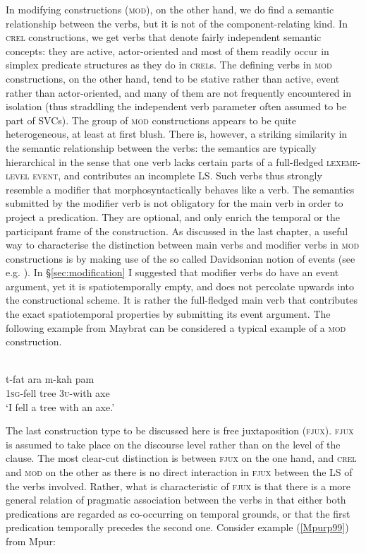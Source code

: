 In modifying constructions (\textsc{mod}), on the other hand, we do find a semantic relationship between the verbs, but it is not of the component-relating kind. In \textsc{crel} constructions, we get verbs that denote fairly independent semantic concepts: they are active, actor-oriented and most of them readily occur in simplex predicate structures as they do in \textsc{crel}s. The defining verbs in \textsc{mod} constructions, on the other hand, tend to be stative rather than active, event rather than actor-oriented, and many of them are not frequently encountered in isolation (thus straddling the independent verb parameter often assumed to be part of SVCs). The group of \textsc{mod} constructions appears to be quite heterogeneous, at least at first blush. There is, however, a striking similarity in the semantic relationship between the verbs: the semantics are typically hierarchical in the sense that one verb lacks certain parts of a full-fledged \textsc{lexeme-level event}, and contributes an incomplete LS. Such verbs thus strongly resemble a modifier that morphosyntactically behaves like a verb. The semantics submitted by the modifier verb is not obligatory for the main verb in order to project a predication. They are optional, and only enrich the temporal or the participant frame of the construction. As discussed in the last chapter, a useful way to characterise the distinction between main verbs and modifier verbs in \textsc{mod} constructions is by making use of the so called Davidsonian notion of events (see e.g. \citealt{maienborn2011event}). In §\ref{sec:modification} I suggested that modifier verbs do have an event argument, yet it is spatiotemporally empty, and does not percolate upwards into the constructional scheme. It is rather the full-fledged main verb that contributes the exact spatiotemporal properties by submitting its event argument. The following example from Maybrat can be considered a typical example of a \textsc{mod} construction. 

\ea 
{}\\
\gll t-fat ara m-kah pam \\
1\textsc{sg}-fell tree 3\textsc{u}-with axe \\
\glft `I fell a tree with an axe.'\\ 
\z

The last construction type to be discussed here is free juxtaposition (\textsc{fjux}). \textsc{fjux} is assumed to take place on the discourse level rather than on the level of the clause. The most clear-cut distinction is between \textsc{fjux} on the one hand, and \textsc{crel} and \textsc{mod} on the other as there is no direct interaction in \textsc{fjux} between the LS of the verbs involved. Rather, what is characteristic of \textsc{fjux} is that there is a more general relation of pragmatic association between the verbs in that either both predications are regarded as co-occurring on temporal grounds, or that the first predication temporally precedes the second one. Consider example (\ref{Mpurp99}) from Mpur:

